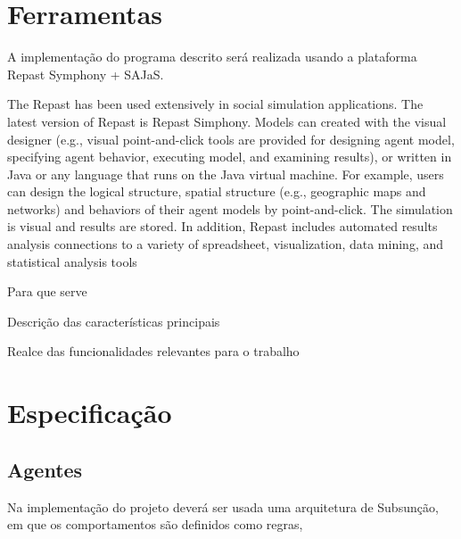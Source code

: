 \documentclass[12pt]{article}
\begin{document}
\begin{titlepage}
\section{Ferramentas}
A implementação do programa descrito será realizada usando a plataforma Repast Symphony + SAJaS.

The Repast has been used extensively in social simulation applications. The latest
version of Repast is Repast Simphony. Models can created with the visual designer
(e.g., visual point-and-click tools are provided for designing agent model, specifying
agent behavior, executing model, and examining results), or written in Java or any
language that runs on the Java virtual machine. For example, users can design the
logical structure, spatial structure (e.g., geographic maps and networks) and behaviors
of their agent models by point-and-click. The simulation is visual and results are
stored. In addition, Repast includes automated results analysis connections to a
variety of spreadsheet, visualization, data mining, and statistical analysis tools 

Para que serve

Descrição das características principais

Realce das funcionalidades relevantes para o trabalho


\section{Especificação}
\subsection{Agentes}
Na implementação do projeto deverá ser usada uma arquitetura de Subsunção, em que os comportamentos são definidos como regras, 


\end{titlepage}
\end{document}
